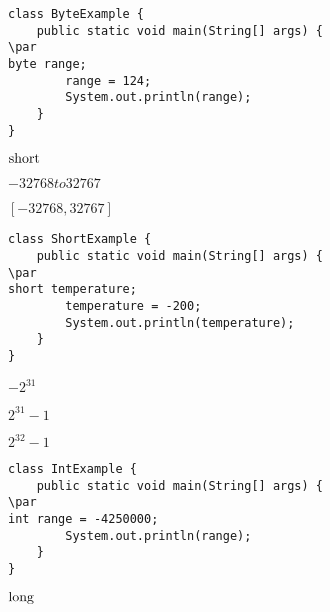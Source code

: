 \documentclass{book}
\def\lthtmlcheckvsize{\ifdim\ht\sizebox<\vsize 
  \ifdim\wd\sizebox<\hsize\expandafter\hfill\fi \expandafter\vfill
  \else\expandafter\vss\fi}%
\begin{document}
{\newpage\clearpage
{}%
\begin{lstlisting}
class ByteExample {
    public static void main(String[] args) {
\par
byte range;
        range = 124;
        System.out.println(range);
    }
}
\end{lstlisting}%
\lthtmlfigureZ
\lthtmlcheckvsize\clearpage}

{\newpage\clearpage
{}%
$\lstinline{short}$%
\lthtmlindisplaymathZ
\lthtmlcheckvsize\clearpage}

{\newpage\clearpage
{}%
$-32768 to 32767$%
\lthtmlindisplaymathZ
\lthtmlcheckvsize\clearpage}

{\newpage\clearpage
{}%
$[-32768, 32767]$%
\lthtmlindisplaymathZ
\lthtmlcheckvsize\clearpage}

{\newpage\clearpage
{}%
\begin{lstlisting}
class ShortExample {
    public static void main(String[] args) {
\par
short temperature;
        temperature = -200;
        System.out.println(temperature);
    }
}
\end{lstlisting}%
\lthtmlfigureZ
\lthtmlcheckvsize\clearpage}

{\newpage\clearpage
{}%
$-2^31$%
\lthtmlindisplaymathZ
\lthtmlcheckvsize\clearpage}

{\newpage\clearpage
{}%
$2^{31}-1$%
\lthtmlindisplaymathZ
\lthtmlcheckvsize\clearpage}

{\newpage\clearpage
{}%
$2^{32}-1$%
\lthtmlindisplaymathZ
\lthtmlcheckvsize\clearpage}

{\newpage\clearpage
{}%
\begin{lstlisting}
class IntExample {
    public static void main(String[] args) {
\par
int range = -4250000;
        System.out.println(range);
    }
}
\end{lstlisting}%
\lthtmlfigureZ
\lthtmlcheckvsize\clearpage}

{\newpage\clearpage
{}%
$\lstinline{long}$%
\lthtmlindisplaymathZ
\lthtmlcheckvsize\clearpage}
\end{document}
